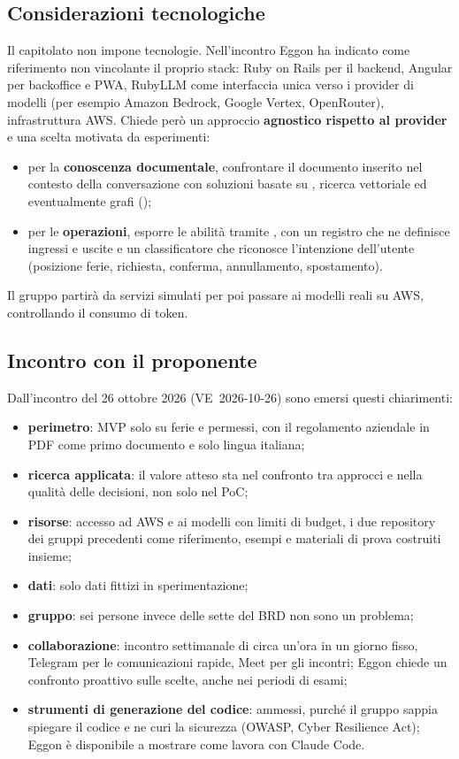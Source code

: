 \subsection{Considerazioni tecnologiche}
Il capitolato non impone tecnologie. Nell'incontro Eggon ha indicato come
riferimento non vincolante il proprio stack: Ruby on Rails per il backend,
Angular per backoffice e PWA, RubyLLM come interfaccia unica verso i
provider di modelli (per esempio Amazon Bedrock, Google Vertex,
OpenRouter), infrastruttura AWS. Chiede però un approccio
\textbf{agnostico rispetto al provider} e una scelta motivata da
esperimenti:
\begin{itemize}
  \item per la \textbf{conoscenza documentale}, confrontare il documento
        inserito nel contesto della conversazione con soluzioni basate su
        , ricerca vettoriale ed eventualmente grafi
        ();
  \item per le \textbf{operazioni}, esporre le abilità tramite ,
        con un registro che ne definisce ingressi e uscite e un
        classificatore che riconosce l'intenzione dell'utente (posizione
        ferie, richiesta, conferma, annullamento, spostamento).
\end{itemize}
Il gruppo partirà da servizi simulati per poi passare ai modelli reali su
AWS, controllando il consumo di token.

\subsection{Incontro con il proponente}
Dall'incontro del 26 ottobre 2026 (VE~2026-10-26) sono emersi questi
chiarimenti:
\begin{itemize}
  \item \textbf{perimetro}: MVP solo su ferie e permessi, con il
        regolamento aziendale in PDF come primo documento e solo lingua
        italiana;
  \item \textbf{ricerca applicata}: il valore atteso sta nel confronto tra
        approcci e nella qualità delle decisioni, non solo nel PoC;
  \item \textbf{risorse}: accesso ad AWS e ai modelli con limiti di
        budget, i due repository dei gruppi precedenti come riferimento,
        esempi e materiali di prova costruiti insieme;
  \item \textbf{dati}: solo dati fittizi in sperimentazione;
  \item \textbf{gruppo}: sei persone invece delle sette del BRD non sono un
        problema;
  \item \textbf{collaborazione}: incontro settimanale di circa un'ora in un
        giorno fisso, Telegram per le comunicazioni rapide, Meet per gli
        incontri; Eggon chiede un confronto proattivo sulle scelte, anche
        nei periodi di esami;
  \item \textbf{strumenti di generazione del codice}: ammessi, purché il
        gruppo sappia spiegare il codice e ne curi la sicurezza (OWASP,
        Cyber Resilience Act); Eggon è disponibile a mostrare come lavora
        con Claude Code.
\end{itemize}

